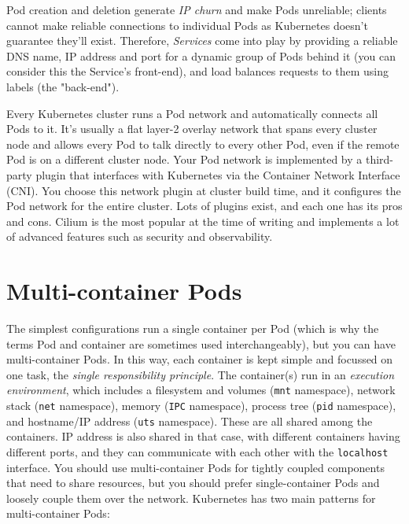 \documentclass[8pt, table, xcdraw]{article}%
\begin{document}
Pod creation and deletion generate \emph{IP churn} and make Pods unreliable; clients cannot make reliable connections to individual Pods as Kubernetes doesn’t guarantee they’ll exist. Therefore, \emph{Services} come into play by providing a reliable DNS name, IP address and port for a dynamic group of Pods behind it (you can consider this the Service's front-end), and load balances requests to them using labels (the "back-end").

Every Kubernetes cluster runs a Pod network and automatically connects all Pods to it. It’s usually a flat layer-2 overlay network that spans every cluster node and allows every Pod to talk directly to every other Pod, even if the remote Pod is on a different cluster node. Your Pod network is implemented by a third-party plugin that interfaces with Kubernetes via the Container Network Interface (CNI). You choose this network plugin at cluster build time, and it configures the Pod network for the entire cluster. Lots of plugins exist, and each one has its pros and cons. Cilium is the most popular at the time of writing and implements a lot of advanced features such as security and observability.

\section{Multi-container Pods}

The simplest configurations run a single container per Pod (which is why the terms Pod and container are sometimes used interchangeably), but you can have multi-container Pods. In this way, each container is kept simple and focussed on one task, the \emph{single responsibility principle}. The container(s) run in an \emph{execution environment}, which includes a filesystem and volumes (\lstinline{mnt} namespace), network stack (\lstinline{net} namespace), memory (\lstinline{IPC} namespace), process tree (\lstinline{pid} namespace), and hostname/IP address (\lstinline{uts} namespace). These are all shared among the containers. IP address is also shared in that case, with different containers having different ports, and they can communicate with each other with the \lstinline{localhost} interface. You should use multi-container Pods for tightly coupled components that need to share resources, but you should prefer single-container Pods and loosely couple them over the network. Kubernetes has two main patterns for multi-container Pods:
\end{document}
